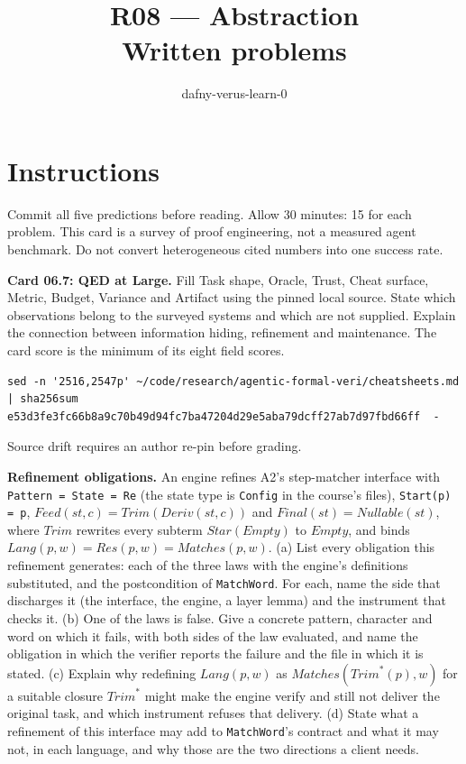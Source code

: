 \documentclass[11pt]{article}
\title{R08 --- Abstraction \\ \large Written problems}
\author{dafny-verus-learn-0}
\date{}
\begin{document}
\maketitle
\section*{Instructions}
Commit all five predictions before reading. Allow 30 minutes: 15 for each
problem. This card is a survey of proof engineering, not a measured agent
benchmark. Do not convert heterogeneous cited numbers into one success rate.
\begin{problem}\label{prob:B1}
\textbf{Card 06.7: QED at Large.} Fill Task shape, Oracle, Trust, Cheat surface,
Metric, Budget, Variance and Artifact using the pinned local source. State
which observations belong to the surveyed systems and which are not supplied.
Explain the connection between information hiding, refinement and maintenance.
The card score is the minimum of its eight field scores.
\begin{verbatim}
sed -n '2516,2547p' ~/code/research/agentic-formal-veri/cheatsheets.md | sha256sum
e53d3fe3fc66b8a9c70b49d94fc7ba47204d29e5aba79dcff27ab7d97fbd66ff  -
\end{verbatim}
Source drift requires an author re-pin before grading.
\end{problem}
\begin{problem}[proof]\label{prob:B2}
\textbf{Refinement obligations.} An engine refines A2's step-matcher interface
with \texttt{Pattern = State = Re} (the state type is \texttt{Config} in the
course's files), \texttt{Start(p) = p},
$\mathit{Feed}(st, c) = \mathit{Trim}(\mathit{Deriv}(st, c))$ and
$\mathit{Final}(st) = \mathit{Nullable}(st)$, where $\mathit{Trim}$ rewrites
every subterm $\mathit{Star}(\mathit{Empty})$ to $\mathit{Empty}$, and binds
$\mathit{Lang}(p, w) = \mathit{Res}(p, w) = \mathit{Matches}(p, w)$.
(a) List every obligation this refinement generates: each of the three laws
with the engine's definitions substituted, and the postcondition of
\texttt{MatchWord}. For each, name the side that discharges it (the
interface, the engine, a layer lemma) and the instrument that checks it.
(b) One of the laws is false. Give a concrete pattern, character and word on
which it fails, with both sides of the law evaluated, and name the obligation
in which the verifier reports the failure and the file in which it is stated.
(c) Explain why redefining $\mathit{Lang}(p, w)$ as
$\mathit{Matches}(\mathit{Trim}^{*}(p), w)$ for a suitable closure
$\mathit{Trim}^{*}$ might make the engine verify and still not deliver the
original task, and which instrument refuses that delivery.
(d) State what a refinement of this interface may add to
\texttt{MatchWord}'s contract and what it may not, in each language, and why
those are the two directions a client needs.
\end{problem}
\end{document}
